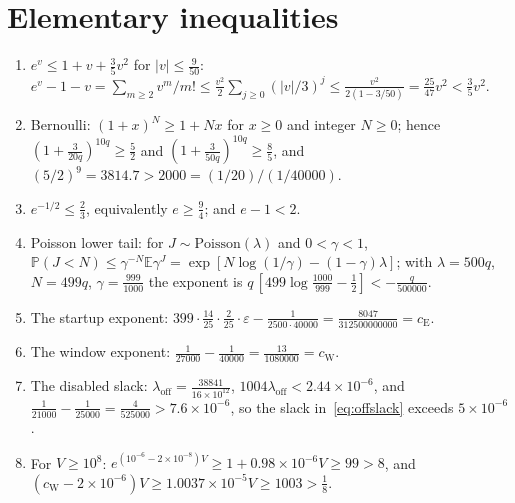 \documentclass[11pt,a4paper]{article}
\theoremstyle{plain}
\theoremstyle{definition}
\theoremstyle{remark}
\newcommand{\E}{\mathbb E}
\newcommand{\Prob}{\mathbb P}
\newcommand{\eps}{\varepsilon}
\newcommand{\cE}{c_{\mathrm E}}
\newcommand{\cW}{c_{\mathrm W}}
\begin{document}
\section{Elementary inequalities}\label{app:ineq}
\begin{enumerate}[label=(\roman*)]
\item $e^v\le1+v+\frac35v^2$ for $|v|\le\frac9{50}$: $e^v-1-v=\sum_{m\ge2}v^m/m!\le\frac{v^2}2\sum_{j\ge0}(|v|/3)^j\le\frac{v^2}{2(1-3/50)}=\frac{25}{47}v^2<\frac35v^2$.
\item Bernoulli: $(1+x)^N\ge1+Nx$ for $x\ge0$ and integer $N\ge0$; hence $(1+\frac3{20q})^{10q}\ge\frac52$ and $(1+\frac3{50q})^{10q}\ge\frac85$, and $(5/2)^9=3814.7>2000=(1/20)/(1/40000)$.
\item $e^{-1/2}\le\frac23$, equivalently $e\ge\frac94$; and $e-1<2$.
\item Poisson lower tail: for $J\sim\mathrm{Poisson}(\lambda)$ and $0<\gamma<1$, $\Prob(J<N)\le\gamma^{-N}\E\gamma^J=\exp[N\log(1/\gamma)-(1-\gamma)\lambda]$; with $\lambda=500q$, $N=499q$, $\gamma=\frac{999}{1000}$ the exponent is $q\,[499\log\frac{1000}{999}-\frac12]<-\frac q{500000}$.
\item The startup exponent: $399\cdot\frac{14}{25}\cdot\frac2{25}\cdot\eps-\frac1{2500\cdot40000}=\frac{8047}{312500000000}=\cE$.
\item The window exponent: $\frac1{27000}-\frac1{40000}=\frac{13}{1080000}=\cW$.
\item The disabled slack: $\lambda_{\mathrm{off}}=\frac{38841}{16\times10^{12}}$, $1004\lambda_{\mathrm{off}}<2.44\times10^{-6}$, and $\frac1{21000}-\frac1{25000}=\frac4{525000}>7.6\times10^{-6}$, so the slack in~\eqref{eq:offslack} exceeds $5\times10^{-6}$.
\item For $V\ge10^8$: $e^{(10^{-6}-2\times10^{-8})V}\ge1+0.98\times10^{-6}V\ge99>8$, and $(\cW-2\times10^{-6})V\ge1.0037\times10^{-5}V\ge1003>\frac18$.
\end{enumerate}
\end{document}
